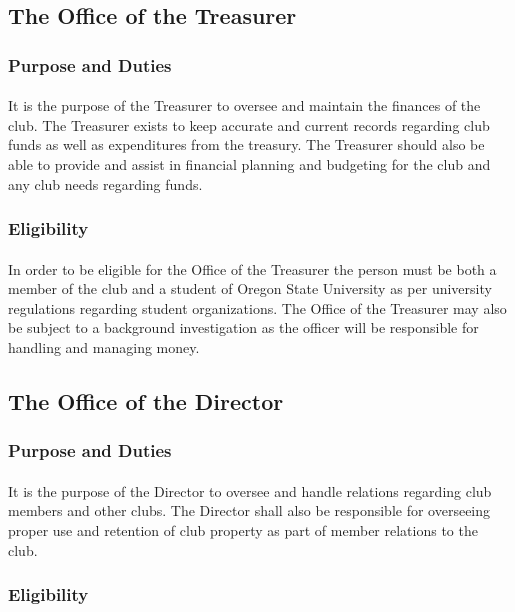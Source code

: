 \documentclass[12pt]{article}
\begin{document}
\subsection{The Office of the Treasurer}
\subsubsection{Purpose and Duties}
\paragraph{}
It is the purpose of the Treasurer to oversee and maintain the finances of the club. The Treasurer exists to keep accurate and current records regarding club funds as well as expenditures from the treasury.
The Treasurer should also be able to provide and assist in financial planning and budgeting for the club and any club needs regarding funds.
\subsubsection{Eligibility}
\paragraph{}
In order to be eligible for the Office of the Treasurer the person must be both a member of the club and a student of Oregon State University as per university regulations regarding student organizations.
The Office of the Treasurer may also be subject to a background investigation as the officer will be responsible for handling and managing money.

\subsection{The Office of the Director}
\subsubsection{Purpose and Duties}
\paragraph{}
It is the purpose of the Director to oversee and handle relations regarding club members and other clubs. The Director shall also be responsible for overseeing proper use and retention of club property as 
part of member relations to the club. 
\subsubsection{Eligibility}
\end{document}
